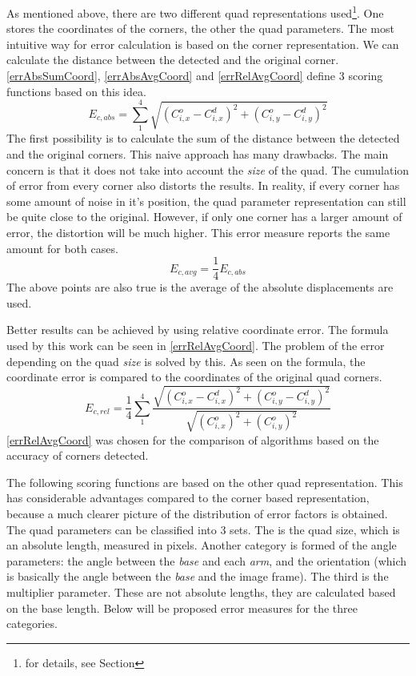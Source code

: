 As mentioned above, there are two different quad representations used\footnote{for details, see Section }.
One stores the coordinates of the corners, the other the quad parameters.
The most intuitive way for error calculation is based on the corner representation.
We can calculate the distance between the detected and the original corner.
\eqref{errAbsSumCoord}, \eqref{errAbsAvgCoord} and \eqref{errRelAvgCoord} define 3 scoring functions based on this idea. 
\begin{equation}
	E_{c,abs} = \sum_{1}^{4} \sqrt{(C_{i,x}^o - C_{i,x}^d)^2 + (C_{i,y}^o - C_{i,y}^d)^2}
	\label{eq:errAbsSumCoord}
\end{equation}
The first possibility is to calculate the sum of the distance between the detected and the original corners.
This naive approach has many drawbacks.
The main concern is that it does not take into account the \textit{size} of the quad.
The cumulation of error from every corner also distorts the results.
In reality, if every corner has some amount of noise in it's position, the quad parameter representation can still be quite close to the original.
However, if only one corner has a larger amount of error, the distortion will be much higher.
This error measure reports the same amount for both cases.
\begin{equation}
	E_{c,avg} = \frac{1}{4} E_{c,abs}
	\label{eq:errAbsAvgCoord}
\end{equation}
The above points are also true is the average of the absolute displacements are used.

Better results can be achieved by using relative coordinate error.
The formula used by this work can be seen in \eqref{errRelAvgCoord}.
The problem of the error depending on the quad \textit{size} is solved by this.
As seen on the formula, the coordinate error is compared to the coordinates of the original quad corners.
\begin{equation}
	E_{c,rel} = \frac{1}{4}\sum_{1}^{4} \frac{\sqrt{(C_{i,x}^o - C_{i,x}^d)^2 + (C_{i,y}^o - C_{i,y}^d)^2}}{\sqrt{(C_{i,x}^o)^2 + (C_{i,y}^o)^2}}
	\label{eq:errRelAvgCoord}
\end{equation}
\eqref{errRelAvgCoord} was chosen for the comparison of algorithms based on the accuracy of corners detected.

The following scoring functions are based on the other quad representation.
This has considerable advantages compared to the corner based representation, because a much clearer picture of the distribution of error factors is obtained.
The quad parameters can be classified into 3 sets.
The is the quad size, which is an absolute length, measured in pixels.
Another category is formed of the angle parameters: the angle between the \textit{base} and each \textit{arm}, and the orientation (which is basically the angle between the \textit{base} and the image frame).
The third is the multiplier parameter.
These are not absolute lengths, they are calculated based on the base length.
Below will be proposed error measures for the three categories.

